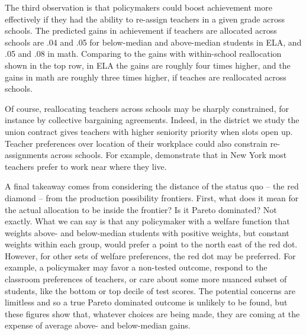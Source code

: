 \documentclass[12pt]{article}
\theoremstyle{definition}
\theoremstyle{definition}
\theoremstyle{definition}
\theoremstyle{definition}
\begin{document}
 The third observation is that policymakers could boost achievement more effectively if they had the ability to re-assign teachers in a given grade across schools. The predicted gains in achievement if teachers are allocated across schools are .04 and .05 for below-median and above-median students in ELA, and .05 and .08 in math. Comparing to the gains with within-school reallocation shown in the top row, in ELA the gains are roughly four times higher, and the gains in math are roughly three times higher, if teaches are reallocated across schools. 

 Of course, reallocating teachers across schools may be sharply constrained, for instance by collective bargaining agreements. Indeed, in the district we study the union contract gives teachers with higher seniority priority when slots open up. Teacher preferences over location of their workplace could also constrain re-assignments across schools. For example, \citep{boyd2005a} demonstrate that in New York most teachers prefer to work near where they live.

 
	A final takeaway comes from considering the distance of the status quo – the red diamond – from the production possibility frontiers. First, what does it mean for the actual allocation to be inside the frontier? Is it Pareto dominated? Not exactly. What we can say is that any policymaker with a welfare function that weights above- and below-median students with positive weights, but constant weights within each group, would prefer a point to the north east of the red dot. However, for other sets of welfare preferences, the red dot may be preferred. For example, a policymaker may favor a non-tested outcome, respond to the classroom preferences of teachers, or care about some more nuanced subset of students, like the bottom or top decile of test scores. The potential concerns are limitless and so a true Pareto dominated outcome is unlikely to be found, but these figures show that, whatever choices are being made, they are coming at the expense of average above- and below-median gains.
\end{document}
